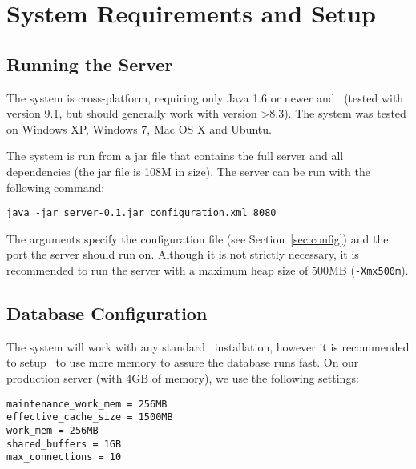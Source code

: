 \label{chap:technical_manual}

\section{System Requirements and Setup}

\subsection{Running the Server}

The system is cross-platform, requiring only Java 1.6 or newer and \postgres~(tested with version 9.1, but should generally work with version >8.3). The system was tested on Windows XP, Windows 7, Mac OS X and Ubuntu.

The system is run from a jar file that contains the full server and all dependencies (the jar file is 108M in size). The server can be run with the following command:

\vspace*{0.5em}
\begin{lstlisting}
java -jar server-0.1.jar configuration.xml 8080
\end{lstlisting}
\vspace*{0.5em}

The arguments specify the configuration file (see Section~\ref{sec:config}) and the port the server should run on. Although it is not strictly necessary, it is recommended to run the server with a maximum heap size of 500MB ({\tt -Xmx500m}).


\subsection{Database Configuration}
\label{sec:dbconfig}

The system will work with any standard \postgres~installation, however it is recommended to setup \postgres~to use more memory to assure the database runs fast. On our production server (with 4GB of memory), we use the following settings:


\vspace*{0.5em}
\begin{lstlisting}
maintenance_work_mem = 256MB
effective_cache_size = 1500MB
work_mem = 256MB
shared_buffers = 1GB
max_connections = 10
\end{lstlisting}
\vspace*{0.5em}

